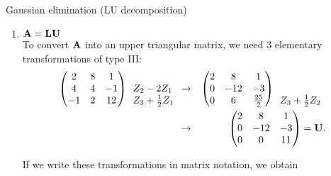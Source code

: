 \begin{vbframe}{Gaussian elimination (LU decomposition)}
\begin{enumerate}
\item $\mathbf{A} = \mathbf{LU}$\\

To convert $\mathbf{A}$ into an upper triangular matrix, we need 3
elementary transformations of type III:
\footnotesize
\begin{eqnarray*}
\begin{pmatrix} 
2 & 8 & 1 \\
4 & 4 & -1 \\
-1 & 2 & 12  \end{pmatrix}
\begin{array}{l}
 \\
Z_2 - 2Z_1 \\
Z_3 + \frac{1}{2} Z_1
\end{array} &\rightarrow& \begin{pmatrix} 
2 & 8 & 1 \\
0 & -12 & -3 \\
0 & 6 & \frac{25}{2}  \end{pmatrix}
\begin{array}{l}
 \\
 \\
 Z_3 + \frac{1}{2} Z_2
\end{array} \\
&\rightarrow& \begin{pmatrix} 
2 & 8 & 1 \\
0 & -12 & -3 \\
0 & 0 & 11  \end{pmatrix}
= \mathbf{U}.
\end{eqnarray*} \normalsize

\framebreak

If we write these transformations in matrix notation, we obtain


\end{enumerate}
\end{vbframe}
